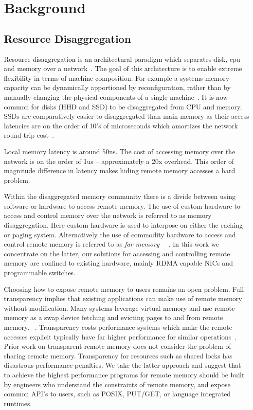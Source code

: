 \section{Background}


\subsection{Resource Disaggregation}

Resource disaggregation is an architectural paradigm which separates disk, cpu
and memory over a network~\cite{requirements,legoos}. The goal of this
architecture is to enable extreme flexibility in terms of machine composition.
For example a systems memory capacity can be dynamically apportioned by
reconfiguration, rather than by manually changing the physical components of a
single machine~\cite{fastswap}. It is now common for disks (HHD and SSD) to be
disaggregated from CPU and memory. SSDs are comparatively easier to
disaggregated than main memory as their access latencies are on the order of
10's of microseconds which amortizes the network round trip cost~\cite{decible}.

Local memory latency is around 50ns. The cost of accessing memory over the
network is on the order of 1us -- approximately a 20x overhead. This order of
magnitude difference in latency makes hiding remote memory accesses a hard
problem.  

Within the disaggregated memory community there is a divide between using
software or hardware to access remote memory.  The use of custom hardware to
access and control memory over the network is referred to as memory
disaggregation. Here custom hardware is used to interpose on either the caching
or paging system. Alternatively the use of commodity hardware to access and
control remote memory is referred to as \textit{far memory} ~\cite{reigons,
legoos, clover}~. In this work we concentrate on the latter, our
solutions for accessing and controlling remote memory are confined to existing
hardware, mainly RDMA capable NICs and programmable switches.

Choosing how to expose remote memory to users remains an open problem. Full
transparency implies that existing applications can make use of remote memory
without modification. Many systems leverage virtual memory and use remote memory
as a swap device fetching and evicting pages to and from remote memory.
~\cite{fastswap,GMS,infiniswap,leap}. Transparency costs performance systems
which make the remote accesses explicit typically have far higher performance
for similar operations~\cite{aifm}.
Prior work on transparent remote memory does not consider the problem of sharing
remote memory. Transparency for resources such as shared locks has disastrous
performance penalties.  We take the latter approach and suggest that to achieve
the highest performance programs for remote memory should be built by engineers
who understand the constraints of remote memory, and expose common API's to
users, such as POSIX, PUT/GET, or language integrated runtimes.

